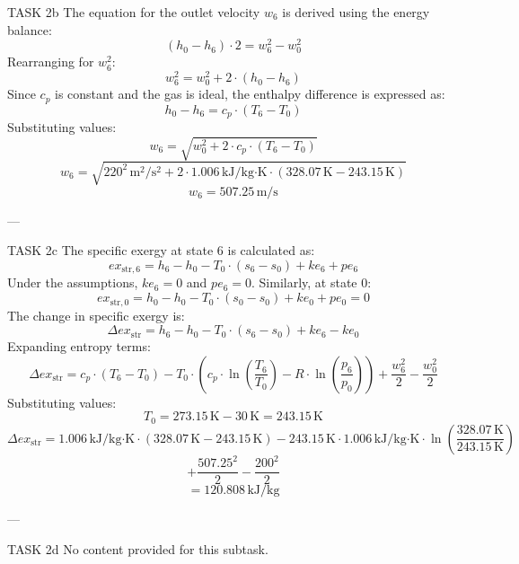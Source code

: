 TASK 2b  
The equation for the outlet velocity \( w_6 \) is derived using the energy balance:  
\[
(h_0 - h_6) \cdot 2 = w_6^2 - w_0^2
\]  
Rearranging for \( w_6^2 \):  
\[
w_6^2 = w_0^2 + 2 \cdot (h_0 - h_6)
\]  
Since \( c_p \) is constant and the gas is ideal, the enthalpy difference is expressed as:  
\[
h_0 - h_6 = c_p \cdot (T_6 - T_0)
\]  
Substituting values:  
\[
w_6 = \sqrt{w_0^2 + 2 \cdot c_p \cdot (T_6 - T_0)}
\]  
\[
w_6 = \sqrt{220^2 \, \text{m}^2/\text{s}^2 + 2 \cdot 1.006 \, \text{kJ}/\text{kg·K} \cdot (328.07 \, \text{K} - 243.15 \, \text{K})}
\]  
\[
w_6 = 507.25 \, \text{m/s}
\]  

---

TASK 2c  
The specific exergy at state 6 is calculated as:  
\[
ex_{\text{str},6} = h_6 - h_0 - T_0 \cdot (s_6 - s_0) + ke_6 + pe_6
\]  
Under the assumptions, \( ke_6 = 0 \) and \( pe_6 = 0 \). Similarly, at state 0:  
\[
ex_{\text{str},0} = h_0 - h_0 - T_0 \cdot (s_0 - s_0) + ke_0 + pe_0 = 0
\]  
The change in specific exergy is:  
\[
\Delta ex_{\text{str}} = h_6 - h_0 - T_0 \cdot (s_6 - s_0) + ke_6 - ke_0
\]  
Expanding entropy terms:  
\[
\Delta ex_{\text{str}} = c_p \cdot (T_6 - T_0) - T_0 \cdot (c_p \cdot \ln\left(\frac{T_6}{T_0}\right) - R \cdot \ln\left(\frac{p_6}{p_0}\right)) + \frac{w_6^2}{2} - \frac{w_0^2}{2}
\]  
Substituting values:  
\[
T_0 = 273.15 \, \text{K} - 30 \, \text{K} = 243.15 \, \text{K}
\]  
\[
\Delta ex_{\text{str}} = 1.006 \, \text{kJ}/\text{kg·K} \cdot (328.07 \, \text{K} - 243.15 \, \text{K}) - 243.15 \, \text{K} \cdot 1.006 \, \text{kJ}/\text{kg·K} \cdot \ln\left(\frac{328.07 \, \text{K}}{243.15 \, \text{K}}\right)
\]  
\[
+ \frac{507.25^2}{2} - \frac{200^2}{2}
\]  
\[
= 120.808 \, \text{kJ}/\text{kg}
\]  

---

TASK 2d  
No content provided for this subtask.